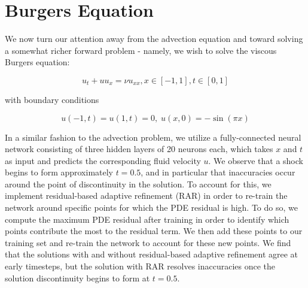 \documentclass[letterpaper,11pt]{article}
\begin{document}
    \section{Burgers Equation}
    We now turn our attention away from the advection equation and toward solving a somewhat richer forward problem - 
    namely, we wish to solve the viscous Burgers equation:

    $$
    u_t + u u_x = \nu u_{xx}, x \in [-1, 1], t \in [0, 1]
    $$

    \noindent with boundary conditions

    $$
    u(-1, t) = u(1, t) = 0,\; u(x, 0) = -\sin{(\pi x)}
    $$

    In a similar fashion to the advection problem, we utilize a fully-connected neural network consisting of
    three hidden layers of 20 neurons each, which takes $x$ and $t$ as input and predicts the corresponding fluid 
    velocity $u$.  We observe that a shock begins to form approximately $t = 0.5$, and in particular that inaccuracies 
    occur around the point of discontinuity in the solution. To account for this, we implement residual-based adaptive 
    refinement (RAR) in order to re-train the network around specific points for which the PDE residual is 
    high.\cite{WU2023115671} To do so, we compute the maximum PDE residual after training in order to identify which 
    points contribute the most to the residual term. We then add these points to our training set and re-train the 
    network to account for these new points. We find that the solutions with and without residual-based adaptive 
    refinement agree at early timesteps, but the solution with RAR resolves inaccuracies once the solution discontinuity 
    begins to form at $t = 0.5$.
\end{document}
